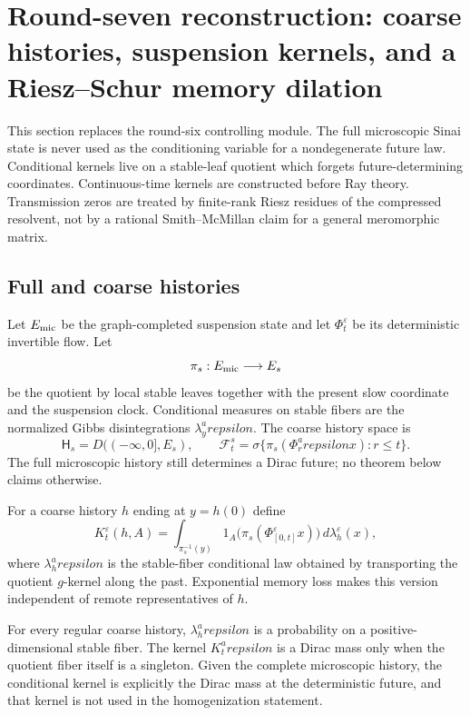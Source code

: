 \section{Round-seven reconstruction: coarse histories, suspension kernels, and a Riesz--Schur memory dilation}
\label{sec:r7-a4}

This section replaces the round-six controlling module.  The full microscopic
Sinai state is never used as the conditioning variable for a nondegenerate
future law.  Conditional kernels live on a stable-leaf quotient which forgets
future-determining coordinates.  Continuous-time kernels are constructed
before Ray theory.  Transmission zeros are treated by finite-rank Riesz
residues of the compressed resolvent, not by a rational Smith--McMillan claim
for a general meromorphic matrix.

\subsection{Full and coarse histories}

Let $E_{\rm mic}$ be the graph-completed suspension state and let
$\Phi_t^\varepsilon$ be its deterministic invertible flow.  Let
\[
 \pi_s:E_{\rm mic}\longrightarrow E_s
\]
be the quotient by local stable leaves together with the present slow
coordinate and the suspension clock.  Conditional measures on stable fibers
are the normalized Gibbs disintegrations $\lambda_y^arepsilon$.  The coarse
history space is
\[
 \mathsf H_s=D(( -\infty,0],E_s),
 \qquad
 \mathcal F_t^s=\sigma\{\pi_s(\Phi_r^arepsilon x):r\le t\}.
\]
The full microscopic history still determines a Dirac future; no theorem below
claims otherwise.

For a coarse history $h$ ending at $y=h(0)$ define
\[
 K_t^\varepsilon(h,A)=
 \int_{\pi_s^{-1}(y)}
  1_A\bigl(\pi_s(\Phi_{[0,t]}^\varepsilon x)\bigr)
  \,d\lambda_{h}^{\varepsilon}(x),
\]
where $\lambda_h^arepsilon$ is the stable-fiber conditional law obtained by
transporting the quotient $g$-kernel along the past.  Exponential memory loss
makes this version independent of remote representatives of $h$.

\begin{lemma}
\label{lem:r7-a4-coarse}
For every regular coarse history, $\lambda_h^arepsilon$ is a probability on
a positive-dimensional stable fiber.  The kernel $K_t^arepsilon$ is a Dirac
mass only when the quotient fiber itself is a singleton.  Given the complete
microscopic history, the conditional kernel is explicitly the Dirac mass at
the deterministic future, and that kernel is not used in the homogenization
statement.
\end{lemma}

